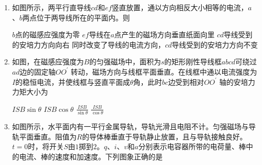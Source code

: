 \begin{enumerate}
\item
{}
如图所示，两平行直导线$ cd $和$ ef $竖直放置，通以方向相反大小相等的电流，$ a $、$ b $两点位于两导线所在的平面内。则  
\begin{figure}[h!]
	\centering

\end{figure}


\fourchoices
{$ b $点的磁感应强度为零}
{$ ef $导线在$ a $点产生的磁场方向垂直纸面向里}
{$ cd $导线受到的安培力方向向右}
{同时改变了导线的电流方向，$ cd $导线受到的安培力方向不变}







\item
{}
如图，在磁感应强度为$ B $的匀强磁场中，面积为$ s $的矩形刚性导线框$ abcd $可绕过$ ad $边的固定轴$ OO ^{\prime} $ 转动，磁场方向与线框平面垂直。在线框中通以电流强度为$ I $的稳恒电流，并使线框与竖直平面成$ \theta $角，此时$ bc $边受到相对$ OO ^{\prime} $ 轴的安培力力矩大小为  
\begin{figure}[h!]
\centering

\end{figure}

\fourchoices
{$I S B \sin \theta$}
{$I S B \cos \theta$}
{$\frac { I S B } { \sin \theta }$}
{$\frac { I S B } { \cos \theta }$}






\item
{}
如图所示，水平面内有一平行金属导轨，导轨光滑且电阻不计。匀强磁场与导轨平面垂直。阻值为$ R $的导体棒垂直于导轨静止放置，且与导轨接触良好。$ t=0 $时，将开关$ S $由$ 1 $掷到$ 2 $。$ q $、$ i $、$ v $和$ a $分别表示电容器所带的电荷量、棒中的电流、棒的速度和加速度。下列图象正确的是  
\begin{figure}[h!]
\centering

\end{figure}

\pfourchoices
{}
{}
{}
{}







\end{enumerate}
